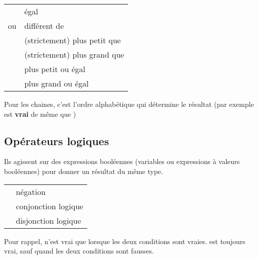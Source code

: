 			\begin{center}
			\tablehead{}
			\begin{supertabular}{m{2cm}|m{11cm}}
			\raggedleft  \textstyleCodeInsr{=} & égal\\
			\raggedleft  \textstyleCodeInsr{{\textless}{\textgreater}}
				ou \textstyleCodeInsr{${\neq}$} &  différent de\\
			\raggedleft  \textstyleCodeInsr{\textless} & (strictement) plus petit que\\
			\raggedleft  \textstyleCodeInsr{\textgreater} & (strictement) plus grand que\\
			\raggedleft  \textstyleCodeInsr{${\leq}$} & plus petit ou égal\\
			\raggedleft  \textstyleCodeInsr{${\geq}$} & plus grand ou égal\\
			\end{supertabular}
			\end{center}
	
			Pour les chaines, c'est l’ordre alphabétique qui
			détermine le résultat (par exemple
			 est \textbf{vrai} de même que
			\textstyleCodeInsr{${\leq}$})
			
	
		\subsection{Opérateurs logiques}
	
			Ils agissent sur des expressions booléennes (variables ou expressions à
			valeurs booléennes) pour donner un résultat du même type.
	
			\begin{center}
			\tablehead{}
			\begin{supertabular}{m{1cm}|m{12cm}}
			\raggedleft  {} & négation\\
			\raggedleft  {} & conjonction logique\\
			\raggedleft  {} & disjonction logique\\
			\end{supertabular}
			\end{center}
	
			Pour rappel,  n’est vrai que lorsque
			les deux conditions sont vraies.  est
			toujours vrai, sauf quand les deux conditions sont fausses.
	
